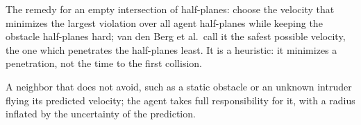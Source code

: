 \item[Dense fallback] The remedy for an empty intersection of \orca half-planes: choose the velocity that minimizes the largest violation over all agent half-planes while keeping the obstacle half-planes hard; van den Berg et al.\ call it the safest possible velocity, the one which penetrates the half-planes least. It is a heuristic: it minimizes a penetration, not the time to the first collision.
\item[Non-cooperative obstacle] A neighbor that does not avoid, such as a static obstacle or an unknown intruder flying its predicted velocity; the agent takes full responsibility for it, with a radius inflated by the uncertainty of the prediction.
